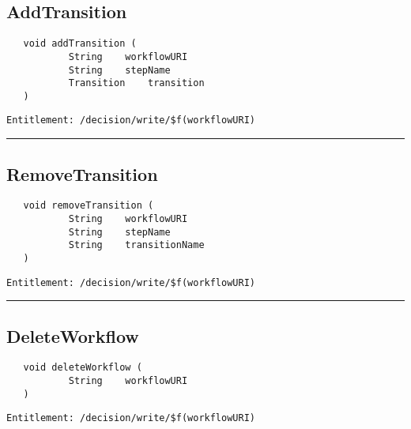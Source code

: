 \subsection{AddTransition}
\label{Api:AddTransition}
\begin{Verbatim}
   void addTransition (
           String    workflowURI
           String    stepName
           Transition    transition
   )
\end{Verbatim}
\begin{Verbatim}[formatcom=\color{Maroon}]
  Entitlement: /decision/write/$f(workflowURI)
\end{Verbatim}



\rule{12cm}{2pt}
\subsection{RemoveTransition}
\label{Api:RemoveTransition}
\begin{Verbatim}
   void removeTransition (
           String    workflowURI
           String    stepName
           String    transitionName
   )
\end{Verbatim}
\begin{Verbatim}[formatcom=\color{Maroon}]
  Entitlement: /decision/write/$f(workflowURI)
\end{Verbatim}



\rule{12cm}{2pt}
\subsection{DeleteWorkflow}
\label{Api:DeleteWorkflow}
\begin{Verbatim}
   void deleteWorkflow (
           String    workflowURI
   )
\end{Verbatim}
\begin{Verbatim}[formatcom=\color{Maroon}]
  Entitlement: /decision/write/$f(workflowURI)
\end{Verbatim}



